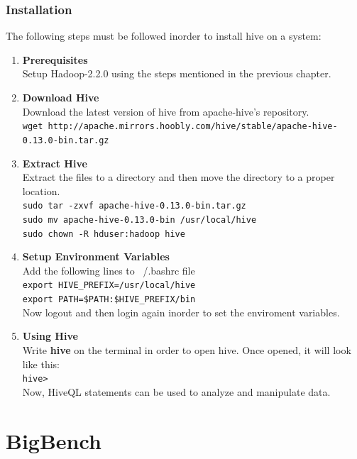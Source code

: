 \documentclass[12pt]{book}
\newcommand{\shellcmd}[1]{\\\indent\texttt{\footnotesize #1}\\}
\begin{document}
\subsection{Installation}
The following steps must be followed inorder to install hive on a system:
\begin{enumerate}
 \item \textbf{Prerequisites}
 \\\indent Setup Hadoop-2.2.0 using the steps mentioned in the previous chapter.
 \item \textbf{Download Hive}
 \\\indent Download the latest version of hive from apache-hive's repository.
  \shellcmd{wget http://apache.mirrors.hoobly.com/hive/stable/apache-hive-0.13.0-bin.tar.gz}
 \item \textbf{Extract Hive}
 \\\indent Extract the files to a directory and then move the directory to a proper location.
 \shellcmd{sudo tar -zxvf apache-hive-0.13.0-bin.tar.gz\\\indent
  sudo mv apache-hive-0.13.0-bin /usr/local/hive\\\indent
  sudo chown -R hduser:hadoop hive
 }
 \item \textbf{Setup Environment Variables}
 \\\indent Add the following lines to ~/.bashrc file
 \shellcmd{export HIVE\_PREFIX=/usr/local/hive\\\indent
 export PATH=\$PATH:\$HIVE\_PREFIX/bin
 }Now logout and then login again inorder to set the enviroment variables.
 \item \textbf{Using Hive}
 \\\indent Write \textbf{hive} on the terminal in order to open hive. Once opened, it will look like this:
 \shellcmd{hive>}
 Now, HiveQL statements can be used to analyze and manipulate data.
\end{enumerate}



\chapter{BigBench}
\end{document}
